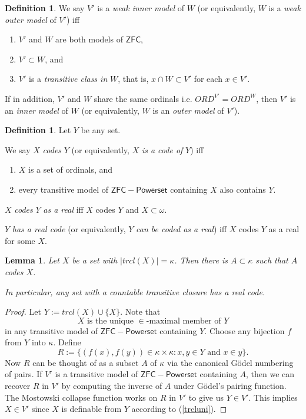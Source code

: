 \documentclass[12pt, twoside]{memoir}
\numberwithin{equation}{section}
\newtheorem{lem}[thm]{Lemma}
\theoremstyle{definition}
\newtheorem{defi}[thm]{Definition}
\theoremstyle{remark}
\theoremstyle{definition}
\theoremstyle{definition}
\theoremstyle{definition}
\theoremstyle{remark}
\begin{document}
\begin{defi}\label{inoutmodels}
We say $V'$ is a \emph{weak inner model} of $W$ (or equivalently, $W$ is a \emph{weak outer model} of $V'$) iff
\begin{enumerate}[label=(\alph*)]
    \item $V'$ and $W$ are both models of $\mathsf{ZFC}$,
    \item $V' \subset W$, and
    \item $V'$ is a \textit{transitive class in} $W$, that is, $x \cap W \subset V'$ for each $x \in V'$.
\end{enumerate}
If in addition, $V'$ and $W$ share the same ordinals i.e. $ORD^{V'} = ORD^W$, then $V'$ is an \emph{inner model} of $W$ (or equivalently, $W$ is an \emph{outer model} of $V'$).
\end{defi}
\begin{defi}
Let $Y$ be any set.

We say $X$ \emph{codes} $Y$ (or equivalently, $X$ \emph{is a code of} $Y$) iff 
\begin{enumerate}[label=(\alph*)]
    \item $X$ is a set of ordinals, and
    \item every transitive model of $\mathsf{ZFC - Powerset}$ containing $X$ also contains $Y$.
\end{enumerate}

$X$ \emph{codes} $Y$ \emph{as a real} iff $X$ codes $Y$ and $X \subset \omega$.

$Y$ \emph{has a real code} (or equivalently, $Y$ \emph{can be coded as a real}) iff $X$ codes $Y$ as a real for some $X$.
\end{defi}

\begin{lem}\label{setcode}
Let $X$ be a set with $|trcl(X)| = \kappa$. Then there is $A \subset \kappa$ such that $A$ codes $X$.

In particular, any set with a countable transitive closure has a real code.
\end{lem}

\begin{proof}
Let $Y := trcl(X) \cup \{X\}$. Note that 
\begin{equation}\label{trcluni}
    X \text{ is the unique } \! \in \!\text{-maximal member of } Y
\end{equation} 
in any transitive model of $\mathsf{ZFC - Powerset}$ containing $Y$. Choose any bijection $f$ from $Y$ into $\kappa$. Define $$R := \{(f(x), f(y)) \in \kappa \times \kappa : x, y \in Y \text{ and } x \in y\}.$$ Now $R$ can be thought of as a subset $A$ of $\kappa$ via the canonical G\"{o}del numbering of pairs. If $V'$ is a transitive model of $\mathsf{ZFC - Powerset}$ containing $A$, then we can recover $R$ in $V'$ by computing the inverse of $A$ under G\"{o}del's pairing function. The Mostowski collapse function works on $R$ in $V'$ to give us $Y \in V'$. This implies $X \in V'$ since $X$ is definable from $Y$ according to (\ref{trcluni}). 
\end{proof}
\end{document}
